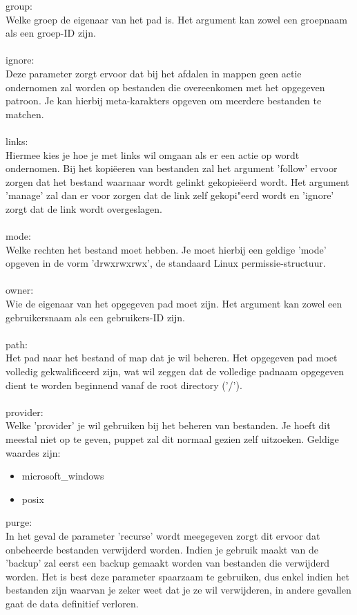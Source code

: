 %
group:\\
Welke groep de eigenaar van het pad is. Het argument kan zowel een groepnaam als een groep-ID zijn.\\\\
%
ignore:\\
Deze parameter zorgt ervoor dat bij het afdalen in mappen geen actie ondernomen zal worden op bestanden die overeenkomen met het opgegeven patroon. Je kan hierbij meta-karakters opgeven om meerdere bestanden te matchen.\\\\
%
links:\\
Hiermee kies je hoe je met links wil omgaan als er een actie op wordt ondernomen. Bij het kopi\"eeren van bestanden zal het argument 'follow' ervoor zorgen dat het bestand waarnaar wordt gelinkt gekopie\"eerd wordt. Het argument 'manage' zal dan er voor zorgen dat de link zelf gekopi"eerd wordt en 'ignore' zorgt dat de link wordt overgeslagen.\\\\
%
mode:\\
Welke rechten het bestand moet hebben. Je moet hierbij een geldige 'mode' opgeven in de vorm 'drwxrwxrwx', de standaard Linux permissie-structuur.\\\\
%
owner:\\
Wie de eigenaar van het opgegeven pad moet zijn. Het argument kan zowel een gebruikersnaam als een gebruikers-ID zijn.\\\\
%
path:\\
Het pad naar het bestand of map dat je wil beheren. Het opgegeven pad moet volledig gekwalificeerd zijn, wat wil zeggen dat de volledige padnaam opgegeven dient te worden beginnend vanaf de root directory ('/').\\\\
%
provider:\\
Welke 'provider' je wil gebruiken bij het beheren van bestanden. Je hoeft dit meestal niet op te geven, puppet zal dit normaal gezien zelf uitzoeken. Geldige waardes zijn:
\begin{itemize}
\item microsoft\_windows
\item posix
\end{itemize}
%
purge:\\
In het geval de parameter 'recurse' wordt meegegeven zorgt dit ervoor dat onbeheerde bestanden verwijderd worden. Indien je gebruik maakt van de 'backup' zal eerst een backup gemaakt worden van bestanden die verwijderd worden. Het is best deze parameter spaarzaam te gebruiken, dus enkel indien het bestanden zijn waarvan je zeker weet dat je ze wil verwijderen, in andere gevallen gaat de data definitief verloren.\\\\
